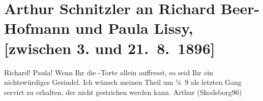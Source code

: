 

         
         \renewcommand{\erwaehntePersonen}{Personen: Richard Beer-Hofmann, Paula Beer-Hofmann}
         \renewcommand{\erwaehnteOrte}{Orte: Skodsborg}
         \renewcommand{\erwaehnteWerke}{}
               \section[Arthur Schnitzler an Richard Beer-Hofmann und Paula Lissy, {[}zwischen 3. und 21. 8. 1896{]}]{ Arthur Schnitzler an Richard Beer-Hofmann und Paula Lissy, {[}zwischen 3.
               und 21. 8. 1896{]}}\nopagebreak{}\rehead{ }\begin{ledgroupsized}[t]{13cm}\normalsize\beginnumbering \toendnotes[C]{\smallbreak\pagebreak[2]} 
\toendnotes[C]{\smallbreak}\pstart\center{}{\pb}Richard! Paula!\pend\pstart
           Wenn Ihr die \label{K_L00577_1v}\label{K_L00577_1h}-Torte
               allein auffresst, so seid Ihr ein nichtswürdiges Gesindel. Ich wünsch meinen Theil um
                  ¼ 9 als letzten Gang servirt zu erhalten, der nicht gestrichen werden
               kann. \spacefill\mbox{Arthur}\pend
           \pstart
           (Skodsborg96)\pend
           
         
         \endnumbering{}\end{ledgroupsized}  \newcommand{\dateiname}{L00577}\newcommand{\titel}{Arthur Schnitzler an Richard Beer-Hofmann und Paula Lissy, [zwischen 3. und 21. 8. 1896]}\newcommand{\editorInnen}{Martin Anton Müller und Gerd-Hermann Susen}
      